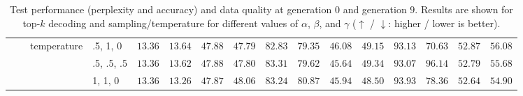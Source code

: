 \begin{table*}[t]
\begin{tabular}{llllcccccccccccc}
        & & \multirow{3}{*}{temperature}  
            & .5, 1, 0 & $13.36$ & $13.64$ & $47.88$ & $47.79$ & $82.83$ & $79.35$ & $46.08$ & $49.15$ & $93.13$ & $70.63$ & $52.87$ & $56.08$ \\
        & & & .5, .5, .5 & $13.36$ & $13.62$ & $47.88$ & $47.80$ & $83.31$ & $79.62$ & $45.64$ & $49.34$ & $93.07$ & $96.14$ & $52.79$ & $55.68$ \\
        & & & 1, 1, 0 & $13.36$ & $13.26$ & $47.87$ & $48.06$ & $83.24$ & $80.87$ & $45.94$ & $48.50$ & $93.93$ & $78.36$ & $52.64$ & $54.90$ \\
        \bottomrule
    \end{tabular}
    \caption{Test performance (perplexity and accuracy) and data quality at generation $0$ and generation $9$. Results are shown for top-$k$ decoding and sampling/temperature for different values of $\alpha$, $\beta$, and $\gamma$ ($\uparrow$ / $\downarrow$: higher / lower is better).}
    \label{tab:mitigation_percentages}
\end{table*}